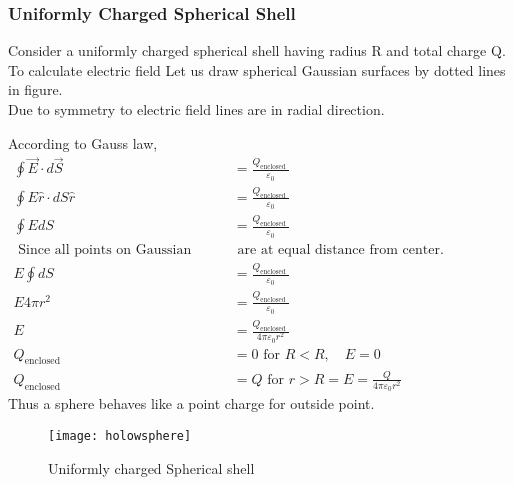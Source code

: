 \subsubsection{Uniformly Charged Spherical Shell}
Consider a uniformly charged spherical shell having radius $\mathrm{R}$ and total charge $\mathrm{Q}$. To calculate electric field Let us draw spherical Gaussian surfaces by dotted lines in figure.\\ Due to symmetry to electric field lines are in radial direction.
\\
\begin{minipage}{0.75\textwidth}
	According to Gauss law,
\begin{align*}
\oint \vec{E} \cdot d \vec{S}&=\frac{Q_{\text {enclosed }}}{\varepsilon_{0}}\\
\oint E \hat{r} \cdot d S \hat{r}&=\frac{Q_{\text {enclosed }}}{\varepsilon_{0}}\\
\oint E d S&=\frac{Q_{\text {enclosed }}}{\varepsilon_{0}}\\
\text { Since all points on Gaussian sphere}&\text{ are at equal distance from center. Therefore. }\\
E \oint d S&=\frac{Q_{\text {enclosed }}}{\varepsilon_{0}} \\
E 4 \pi r^{2}&=\frac{Q_{\text {enclosed }}}{\varepsilon_{0}} \\
E&=\frac{Q_{\text {enclosed }}}{4 \pi \varepsilon_{0} r^{2}}\\
Q_{\text {enclosed }}&=0 \text { for } R<R, \quad E=0 \\
Q_{\text {enclosed }}&=Q \text { for } r>R=E=\frac{Q}{4 \pi \varepsilon_{0} r^{2}}
\end{align*}
Thus a sphere behaves like a point charge for outside point.
\end{minipage}
\begin{minipage}{0.25\textwidth}
	\begin{figure}[H]
		\texttt{[image: holowsphere]}
		\caption{Uniformly charged Spherical shell}
	\end{figure}
\end{minipage}


